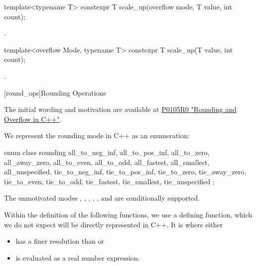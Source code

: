\begin{addedblock}
\begin{itemdecl}
template<typename T>
constexpr T scale_up(overflow mode, T value, int count);
\end{itemdecl}

\begin{itemdescr}
\returns {}.
\end{itemdescr}

\begin{itemdecl}
template<overflow Mode, typename T>
constexpr T scale_up(T value, int count);
\end{itemdecl}

\begin{itemdescr}
\returns {}.
\end{itemdescr}

[round_ops]{Rounding Operations}
\begin{reviewnote}
The initial wording and motivation are available at \hyperlink{http://www.open-std.org/jtc1/sc22/wg21/docs/papers/2015/p0105r0.html}{P0105R0 "Rounding and Overflow in C++"}.
\end{reviewnote}

We represent the rounding mode in C++ as an enumeration:

\begin{codeblock}
enum class rounding {
  all_to_neg_inf, all_to_pos_inf,
  all_to_zero, all_away_zero,
  all_to_even, all_to_odd,
  all_fastest, all_smallest,
  all_unspecified,
  tie_to_neg_inf, tie_to_pos_inf,
  tie_to_zero, tie_away_zero,
  tie_to_even, tie_to_odd,
  tie_fastest, tie_smallest,
  tie_unspecified
};
\end{codeblock}

The unmotivated modes , , , , , and  are conditionally supported.

Within the definition of the following functions, we use a defining function, which we do not expect will be directly represented in C++. It is  where  either

\begin{itemize}
\item has a finer resolution than  or
\item is evaluated as a real number expression.
\end{itemize}


\end{addedblock}
